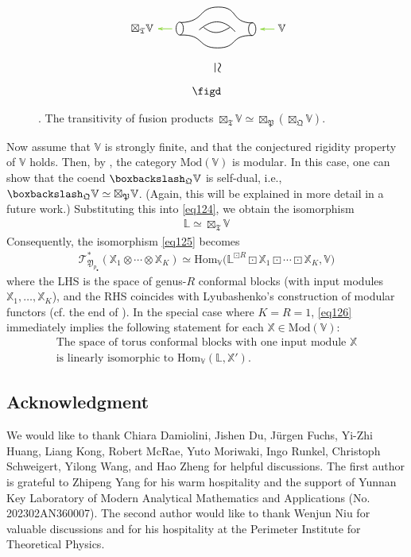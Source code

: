 \documentclass[11pt,b5paper,notitlepage]{article}
\theoremstyle{definition}
\theoremstyle{plain}
\newcommand{\fk}{\mathfrak}
\newcommand{\Hom}{\mathrm{Hom}}
\newcommand{\mbb}{\mathbb}
\newcommand{\blt}{\bullet}
\newcommand{\Vbb}{\mathbb V}
\newcommand{\Xbb}{\mathbb X}
\newcommand{\<}{\left\langle}
\renewcommand{\>}{\right\rangle}
\newcommand{\ST}{\mathscr{T}}
\newcommand{\bbs}{\boxbackslash}
\newcommand{\fq}{{\mathfrak Q}}
\newcommand{\Mod}{\mathrm{Mod}}
\newcommand{\fp}{\mathfrak{P}}
\newcommand{\fy}{\mathfrak{Y}}
\numberwithin{equation}{section}
\begin{document}
\begin{figure}[h]

	\centering
\begin{gather*}
\figc\\
\qquad\rotatebox{-90}{\scalebox{1.3}{$\simeq$}~~}\\
\figd
\end{gather*}


	\caption{. The transitivity of fusion products $\boxtimes_{\fk T}\Vbb\simeq\boxtimes_\fp(\boxtimes_\fq\Vbb)$.}
	\label{fig5}
\end{figure} 



Now assume that $\Vbb$ is strongly finite, and that the conjectured rigidity property of $\Vbb$ holds. Then, by \cite{McR21-rational}, the category $\Mod(\Vbb)$ is modular. In this case, one can show that the coend $\bbs_\fq\Vbb$ is self-dual, i.e., $\bbs_\fq\Vbb\simeq\boxtimes_\fp\Vbb$. (Again, this will be explained in more detail in a future work.) Substituting this into \eqref{eq124}, we obtain the isomorphism
\begin{align*}
\mbb L\simeq\boxtimes_{\fk T}\Vbb
\end{align*}
Consequently, the isomorphism \eqref{eq125} becomes
\begin{align}\label{eq126}
\ST^*_{\fy_{p_\blt}}(\Xbb_1\otimes\cdots\otimes\Xbb_K)\simeq\Hom_\Vbb\big(\mbb L^{\boxdot R}\boxdot\Xbb_1\boxdot\cdots\boxdot\Xbb_K,\Vbb\big)
\end{align}
where the LHS is the space of genus-$R$ conformal blocks (with input modules $\Xbb_1,\dots,\Xbb_K$), and the RHS coincides with Lyubashenko's construction of modular functors (cf. the end of \cite[Sec. 8.2]{Lyu96-Ribbon}). In the special case where $K=R=1$, \eqref{eq126} immediately implies the following statement for each $\Xbb\in\Mod(\Vbb)$:
\begin{gather*}
\text{The space of torus conformal blocks with one input module $\Xbb$}\\
\text{is linearly isomorphic to }\Hom_\Vbb(\mbb L,\Xbb').
\end{gather*}





\subsection*{Acknowledgment}



We would like to thank Chiara Damiolini, Jishen Du, J\"urgen Fuchs, Yi-Zhi Huang, Liang Kong, Robert McRae, Yuto Moriwaki, Ingo Runkel, Christoph Schweigert, Yilong Wang, and Hao Zheng for helpful discussions. The first author is grateful to Zhipeng Yang for his warm hospitality and the support of Yunnan Key Laboratory of Modern Analytical Mathematics and Applications (No. 202302AN360007). The second author would like to thank Wenjun Niu for valuable discussions and for his hospitality at the Perimeter Institute for Theoretical Physics.
\end{document}
